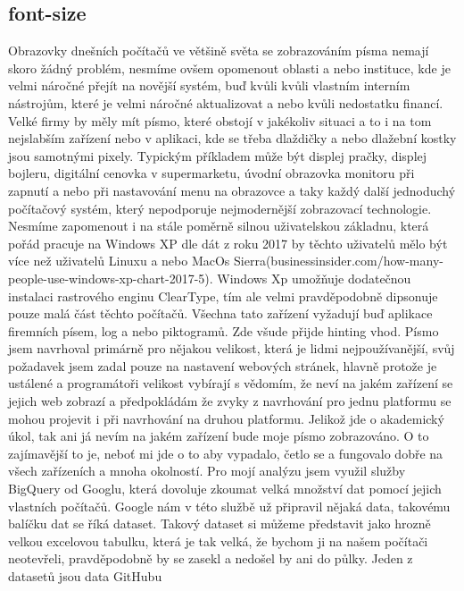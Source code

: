 \documentclass[a4paper]{article}
\begin{document}
\begin{enumerate}
\subsection{font-size}
Obrazovky dnešních počítačů ve většině světa se zobrazováním písma nemají skoro žádný problém, nesmíme ovšem opomenout oblasti a nebo instituce, kde je velmi náročné přejít na novější systém, buď kvůli kvůli vlastním interním nástrojům, které je velmi náročné aktualizovat a nebo kvůli nedostatku financí. Velké firmy by měly mít písmo, které obstojí v jakékoliv situaci a to i na tom nejslabším zařízení nebo v aplikaci, kde se třeba dlaždičky a nebo dlažební kostky jsou samotnými pixely. Typickým příkladem může být displej pračky, displej bojleru, digitální cenovka v supermarketu, úvodní obrazovka monitoru při zapnutí a nebo při nastavování menu na obrazovce a taky každý další jednoduchý počítačový systém, který nepodporuje nejmodernější zobrazovací technologie. Nesmíme zapomenout i na stále poměrně silnou uživatelskou základnu, která pořád pracuje na Windows XP dle dát z roku 2017 by těchto uživatelů mělo být více než uživatelů Linuxu a nebo MacOs Sierra(businessinsider.com/how-many-people-use-windows-xp-chart-2017-5). Windows Xp umožňuje dodatečnou instalaci rastrového enginu ClearType, tím ale velmi pravděpodobně dipsonuje pouze malá část těchto počítačů. Všechna tato zařízení vyžadují buď aplikace firemních písem, log a nebo piktogramů. Zde všude přijde hinting vhod. Písmo jsem navrhoval primárně pro nějakou velikost, která je lidmi nejpoužívanější, svůj požadavek jsem zadal pouze na nastavení webových stránek, hlavně protože je ustálené a programátoři velikost vybírají s vědomím, že neví na jakém zařízení se jejich web zobrazí a předpokládám že zvyky z navrhování pro jednu platformu se mohou projevit i při navrhování na druhou platformu. Jelikož jde o akademický úkol, tak ani já nevím na jakém zařízení bude moje písmo zobrazováno. O to zajímavější to je, neboť mi jde o to aby vypadalo, četlo se a fungovalo dobře na všech zařízeních a mnoha okolností. Pro mojí analýzu jsem využil služby BigQuery od Googlu, která dovoluje zkoumat velká množství dat pomocí jejich vlastních počítačů. Google nám v této službě už připravil nějaká data, takovému balíčku dat se říká dataset. Takový dataset si můžeme představit jako hrozně velkou excelovou tabulku, která je tak velká, že bychom ji na našem počítači neotevřeli, pravděpodobně by se zasekl a nedošel by ani do půlky. Jeden z datasetů jsou data GitHubu
\end{enumerate}
\end{document}
